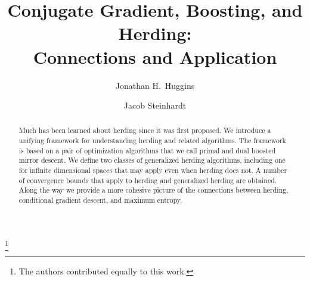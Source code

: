 \documentclass[reqno,oneside,a4paper]{amsart}
\begin{document}
 

\title{Conjugate Gradient, Boosting, and Herding: \\ 
	   Connections and Application}
	   
\thanks{The authors contributed equally to this work.}

\author[J.~H.~Huggins]{Jonathan H.~Huggins}
\address{Massachusetts Institute of Technology}

\author[J.~Steinhardt]{Jacob Steinhardt}
\address{Stanford University}


\begin{abstract} 
Much has been learned about herding since it was first proposed.
We introduce a unifying framework for understanding herding and 
related algorithms. The framework is based on a pair of optimization 
algorithms that we call primal and dual boosted mirror descent.
We define two classes of generalized herding algorithms, 
including one for infinite dimensional spaces
that may apply even when herding does not. A number 
of convergence bounds that apply to herding and generalized
herding are obtained. Along the way we provide
a more cohesive picture of the connections between herding, 
conditional gradient descent, and maximum entropy. 
\end{abstract} 

\maketitle











\end{document}
